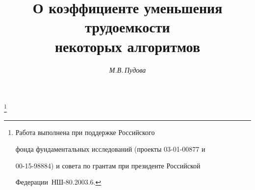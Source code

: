 









\newcommand{\diag}{\operatorname{diag}}


\newcommand{\tts}[1]{}




\renewcommand{\figurename}{Рис.}







\setcounter{page}{50}















\author{\it М.В.\,Пудова}




\title{О коэффициенте уменьшения трудоемкости\\


некоторых алгоритмов}


\thanks{Работа выполнена при поддержке Российского


фонда фундаментальных исследований (проекты 03-01-00877 и


00-15-98884) и совета по грантам при президенте Российской


Федерации \No\,НШ-80.2003.6.}





\date{}




\pagestyle{plain} %





